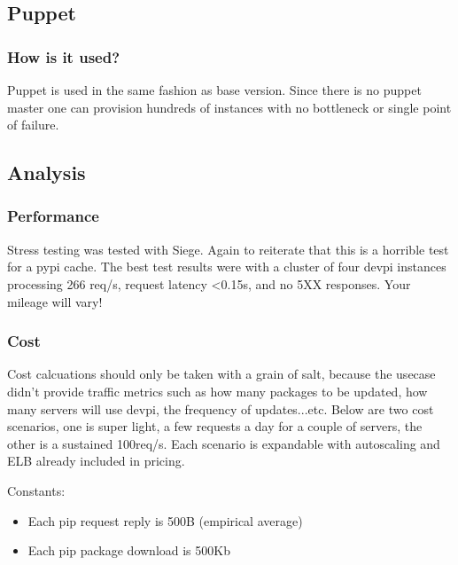 \documentclass[12pt, letterpaper]{article}
\begin{document}
\subsection{Puppet}
\subsubsection{How is it used?}
Puppet is used in the same fashion as base version. Since there is no puppet master one can provision hundreds of instances
with no bottleneck or single point of failure.

\subsection{Analysis}
\subsubsection{Performance}
Stress testing was tested with Siege. Again to reiterate that this is a horrible test for a pypi cache. The best test
results were with a cluster of four devpi instances processing 266 req/s, request latency \textless 0.15s, and no 5XX responses.
Your mileage will vary!

\subsubsection{Cost}
Cost calcuations should only be taken with a grain of salt, because the usecase didn't provide traffic metrics such as
how many packages to be updated, how many servers will use devpi, the frequency of updates...etc. Below are two cost scenarios,
one is super light, a few requests a day for a couple of servers, the other is a sustained 100req/s. Each scenario is 
expandable with autoscaling and ELB already included in pricing.

Constants:
\begin{itemize}
    \item Each pip request reply is 500B (empirical average)
    \item Each pip package download is 500Kb
\end{itemize}
\end{document}
